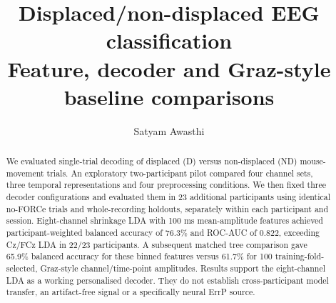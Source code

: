 \documentclass[11pt,a4paper]{article}
\title{Displaced/non-displaced EEG classification\\
\large Feature, decoder and Graz-style baseline comparisons}
\author{Satyam Awasthi}
\date{}
\begin{document}
\maketitle
\begin{abstract}
We evaluated single-trial decoding of displaced (D) versus non-displaced (ND) mouse-movement trials. An exploratory two-participant pilot compared four channel sets, three temporal representations and four preprocessing conditions. We then fixed three decoder configurations and evaluated them in 23 additional participants using identical no-FORCe trials and whole-recording holdouts, separately within each participant and session. Eight-channel shrinkage LDA with 100 ms mean-amplitude features achieved participant-weighted balanced accuracy of 76.3\% and ROC-AUC of 0.822, exceeding Cz/FCz LDA in 22/23 participants. A subsequent matched tree comparison gave 65.9\% balanced accuracy for these binned features versus 61.7\% for 100 training-fold-selected, Graz-style channel/time-point amplitudes. Results support the eight-channel LDA as a working personalised decoder. They do not establish cross-participant model transfer, an artifact-free signal or a specifically neural ErrP source.
\end{abstract}
\end{document}
